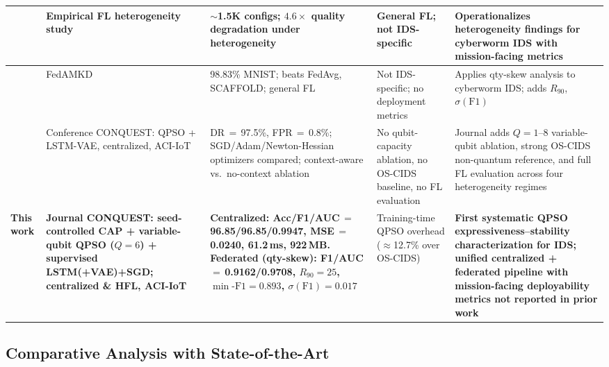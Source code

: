 \documentclass[conference]{IEEEtran}
\begin{document}
\begin{table}[!t]
{\begin{tabular}{p{0.7cm} p{2.3cm} p{4.0cm} p{2.6cm} p{4.6cm}}
\cite{abdelmoniemcomprehensive} &
Empirical FL heterogeneity study &
${\sim}$1.5K configs; $4.6{\times}$ quality
degradation under heterogeneity &
General FL; not IDS-specific &
Operationalizes heterogeneity findings for
cyberworm IDS with mission-facing metrics \\
\midrule

\cite{gefedamkd} &
FedAMKD &
98.83\% MNIST; beats FedAvg, SCAFFOLD;
general FL &
Not IDS-specific; no deployment metrics &
Applies qty-skew analysis to cyberworm IDS;
adds $R_{90}$, $\sigma(\mathrm{F1})$ \\
\midrule

\cite{ajakweconquest} &
Conference CONQUEST:
QPSO + LSTM-VAE,
centralized, ACI-IoT &
DR\,$=$\,97.5\%, FPR\,$=$\,0.8\%;
SGD/Adam/Newton-Hessian optimizers
compared; context-aware vs.\
no-context ablation &
No qubit-capacity ablation,
no OS-CIDS baseline,
no FL evaluation &
Journal adds $Q{=}1\text{--}8$
variable-qubit ablation, strong
OS-CIDS non-quantum reference,
and full FL evaluation across
four heterogeneity regimes \\
\midrule

\textbf{This work} &
\textbf{Journal CONQUEST:
seed-controlled CAP
+ variable-qubit QPSO
($Q{=}6$) + supervised
LSTM(+VAE)+SGD;
centralized \& HFL,
ACI-IoT} &
\textbf{Centralized: Acc/F1/AUC\,$=$\,
96.85/96.85/0.9947,
MSE\,$=$\,0.0240,
61.2\,ms, 922\,MB.
Federated (qty-skew):
F1/AUC\,$=$\,0.9162/0.9708,
$R_{90}{=}25$,
$\min\text{-F1}{=}0.893$,
$\sigma(\mathrm{F1}){=}0.017$} &
Training-time QPSO
overhead (${\approx}$12.7\%
over OS-CIDS) &
\textbf{First systematic QPSO
expressiveness--stability
characterization for IDS;
unified centralized + federated
pipeline with mission-facing
deployability metrics not
reported in prior work} \\

\hline\toprule
\end{tabular}}
\end{table}

\subsection{Comparative Analysis with State-of-the-Art}
\label{subsec:comparative_analysis}
\end{document}
